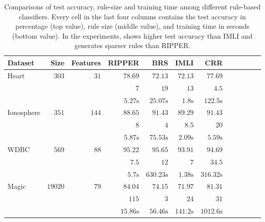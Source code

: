 \begin{table}
	\caption[Accuracy, rule-size, and training time of rule-based classifiers]{Comparisons of test accuracy, rule-size and training time among different rule-based classifiers. Every cell in the last four columns contains the test accuracy in percentage (top value), rule size  (middle value), and  training time in seconds (bottom value). In the experiments, {\crr} shows higher test accuracy than IMLI and generates sparser rules than RIPPER.}
	\label{interpretability_crr_tab:rule_based_classifiers}
	\setlength{\tabcolsep}{3pt} 
	\begin{center}
		\begin{tabular}{l  r  r r r r r r r rrr}
			\toprule
			{{Dataset}} & Size & Features  & RIPPER & BRS & IMLI & CRR\\
			\midrule
			{ Heart}   & $  303 $  & $  31 $  & $   78.69  $    & $   72.13  $    & $   72.13  $    & $   77.69  $   \\[0.05cm] & & 
			& $   7 $    & $   19 $    & $   13 $    & $   4.5  $   \\[0.05cm] & & 
			& $   5.27 \text{s}  $    & $   25.07 \text{s}  $    & $   1.8 \text{s}  $    & $   122.5 \text{s}  $   \\[.3cm] 
			{ Ionosphere}   & $  351 $  & $  144 $  & $   88.65  $    & $   91.43  $    & $   89.29  $    & $   91.43  $   \\[0.05cm] & & 
			& $   8 $    & $   4 $    & $   8.5  $    & $   20 $   \\[0.05cm] & & 
			& $   5.87 \text{s}  $    & $   75.53 \text{s}  $    & $   2.09 \text{s}  $    & $   5.59 \text{s}  $   \\[.3cm] 
			{ WDBC}   & $  569 $  & $  88 $  & $   95.22  $    & $   95.65  $    & $   93.91  $    & $   94.69  $   \\[0.05cm] & & 
			& $   7.5  $    & $   12 $    & $   7 $    & $   34.5  $   \\[0.05cm] & & 
			& $   5.7 \text{s}  $    & $   630.23 \text{s}  $    & $   1.38 \text{s}  $    & $   316.32 \text{s}  $   \\[.3cm] 
			{ Magic}   & $  19020 $  & $  79 $  & $   84.04  $    & $   74.15  $    & $   71.97  $    & $   81.31  $   \\[0.05cm] & & 
			& $   115 $    & $   3 $    & $   24 $    & $   31 $   \\[0.05cm] & & 
			& $   15.86 \text{s}  $    & $   56.46 \text{s}  $    & $   141.2 \text{s}  $    & $   1012.6 \text{s}  $   \\[.3cm] 

\end{tabular}
\end{center}
\end{table}
